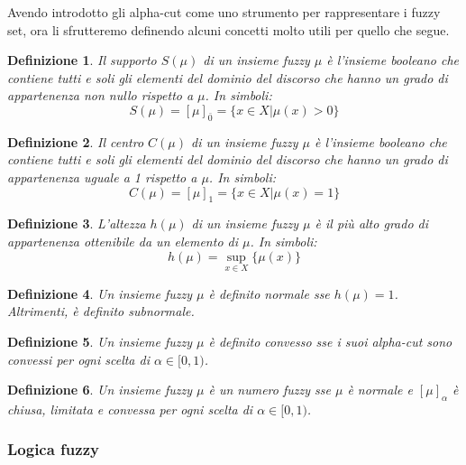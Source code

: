 \documentclass[10pt,a4paper]{article}
\newtheorem{definition}{Definizione}
\begin{document}
Avendo introdotto gli alpha-cut come uno strumento per rappresentare i fuzzy set, ora li sfrutteremo definendo alcuni concetti molto utili per quello che segue.

\begin{definition}
Il \emph{supporto} $S(\mu)$ di un insieme fuzzy $\mu$ è l'insieme booleano che contiene tutti e soli gli elementi del dominio del discorso che hanno un grado di appartenenza non nullo rispetto a $\mu$. In simboli:
$$
S(\mu) = [\mu]_{\bar{0}} = \{ x \in X | \mu(x) > 0 \}
$$
\end{definition}

\begin{definition}
Il \emph{centro} $C(\mu)$ di un insieme fuzzy $\mu$ è l'insieme booleano che contiene tutti e soli gli elementi del dominio del discorso che hanno un grado di appartenenza uguale a 1 rispetto a $\mu$. In simboli:
$$
C(\mu) = [\mu]_{1} = \{ x \in X | \mu(x) = 1 \}
$$
\end{definition}

\begin{definition}
L'\emph{altezza} $h(\mu)$ di un insieme fuzzy $\mu$ è il più alto grado di appartenenza ottenibile da un elemento di $\mu$. In simboli:
$$
h(\mu) = \sup_{x \in X} \{\mu(x)\}
$$
\end{definition}

\begin{definition}
Un insieme fuzzy $\mu$ è definito \emph{normale} sse $h(\mu) = 1$. Altrimenti, è definito \emph{subnormale}.
\end{definition}

\begin{definition}
Un insieme fuzzy $\mu$ è definito \emph{convesso} sse i suoi alpha-cut sono convessi per ogni scelta di $\alpha \in [0,1)$.
\end{definition}

\begin{definition}
Un insieme fuzzy $\mu$ è un \emph{numero fuzzy} sse $\mu$ è normale e $[\mu]_\alpha$ è chiusa, limitata e convessa per ogni scelta di $\alpha \in [0,1)$.
\end{definition}

\subsubsection{Logica fuzzy}
\end{document}
